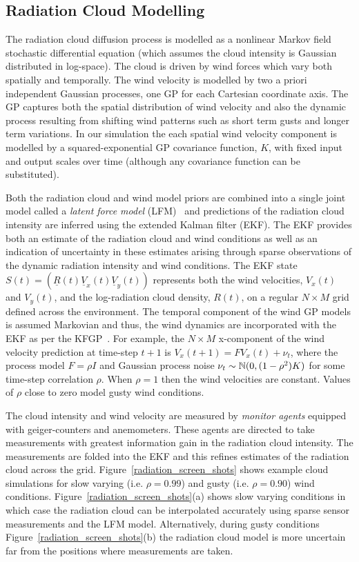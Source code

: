 \subsection{Radiation Cloud Modelling}
The radiation cloud diffusion process is modelled as a nonlinear Markov field stochastic differential equation (which assumes the cloud intensity is Gaussian distributed in log-space).  The cloud is driven by wind forces which vary both spatially and temporally.  The wind velocity is modelled by two a priori independent Gaussian processes, one GP for each Cartesian coordinate axis.  The GP captures both the spatial distribution of wind velocity and also the dynamic process resulting from shifting wind patterns such as short term gusts and longer term variations.  In our simulation the each spatial wind velocity component is modelled by a squared-exponential GP covariance function, $K$, with fixed input and output scales over time (although any covariance function can be substituted).

Both the radiation cloud and wind model priors are combined into a single joint model called a {\it latent force model} (LFM)~\cite{alvarez09} and predictions of the radiation cloud intensity are inferred using the extended Kalman filter (EKF).  The EKF provides both an estimate of the radiation cloud and wind conditions as well as an indication of uncertainty in these estimates arising through sparse observations of the dynamic radiation intensity and wind conditions.  The EKF state $S(t)=(\underline{R}(t) \underline{V}_x(t) \underline{V}_y(t))$ represents both the wind velocities, $V_x(t)$ and $V_y(t)$, and the log-radiation cloud density, $R(t)$, on a regular $N\times M$ grid defined across the environment.  The temporal component of the wind GP models is assumed Markovian and thus, the wind dynamics are incorporated with the EKF as per the KFGP~\cite{reece10}.  For example, the $N\times M$ x-component of the wind velocity prediction at time-step $t+1$ is $V_x(t+1)=F V_x(t)+\nu_t$, where the process model $F=\rho I$ and Gaussian process noise $\nu_t\sim \Bbb{N}(0,(1-\rho^2) K)$ for some time-step correlation $\rho$.  When $\rho=1$ then the wind velocities are constant.  Values of $\rho$ close to zero model gusty wind conditions.

The cloud intensity and wind velocity are measured by {\it monitor agents} equipped with geiger-counters and anemometers.  These agents are directed to take measurements with greatest information gain in the radiation cloud intensity.  The measurements are folded into the EKF and this refines estimates of the radiation cloud across the grid.  Figure~\ref{radiation_screen_shots} shows example cloud simulations for slow varying (i.e. $\rho=0.99$) and gusty (i.e. $\rho=0.90$) wind conditions.  Figure~\ref{radiation_screen_shots}(a) shows slow varying conditions in which case the radiation cloud can be interpolated accurately using sparse sensor measurements and the LFM model.  Alternatively, during gusty conditions Figure~\ref{radiation_screen_shots}(b) the radiation cloud model is more uncertain far from the positions where measurements are taken.

